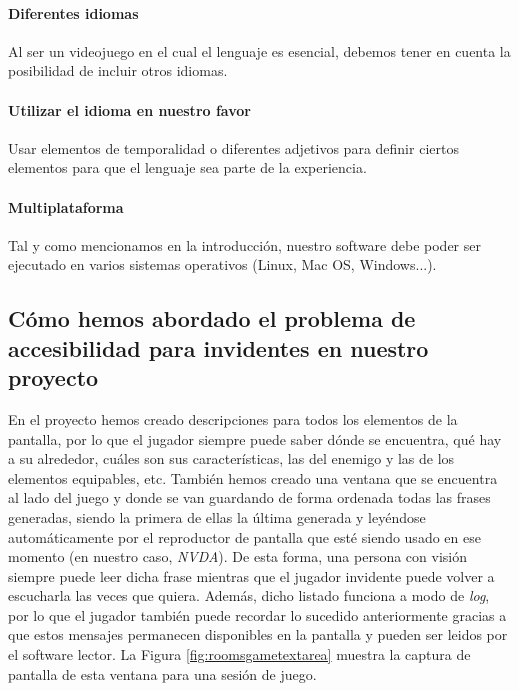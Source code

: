 	\paragraph{Diferentes idiomas} Al ser un videojuego en el cual el lenguaje es esencial, debemos tener en cuenta la posibilidad de incluir otros idiomas.
  \paragraph{Utilizar el idioma en nuestro favor} Usar elementos de temporalidad o diferentes adjetivos para definir ciertos elementos para que el lenguaje sea parte de la experiencia.
	\paragraph{Multiplataforma} Tal y como mencionamos en la introducción, nuestro software debe poder ser ejecutado en varios sistemas operativos (Linux, Mac OS, Windows...).
	
\subsection{Cómo hemos abordado el problema de accesibilidad para invidentes en nuestro proyecto}

En el proyecto hemos creado descripciones para todos los elementos de la pantalla, por lo que el jugador siempre puede saber dónde se encuentra, qué hay a su alrededor, cuáles son sus características, las del enemigo y las de los elementos equipables, etc. También hemos creado una ventana que se encuentra al lado del juego y donde se van guardando de forma ordenada todas las frases generadas, siendo la primera de ellas la última generada y leyéndose automáticamente por el reproductor de pantalla que esté siendo usado en ese momento (en nuestro caso, \textit{NVDA}). De esta forma, una persona con visión siempre puede leer dicha frase mientras que el jugador invidente puede volver a escucharla las veces que quiera. Además, dicho listado funciona a modo de \textit{log}, por lo que el jugador también puede recordar lo sucedido anteriormente gracias a que estos mensajes permanecen disponibles en la pantalla y pueden ser leidos por el software lector. La Figura \ref{fig:roomsgametextarea} muestra la captura de pantalla de esta ventana para una sesión de juego.

